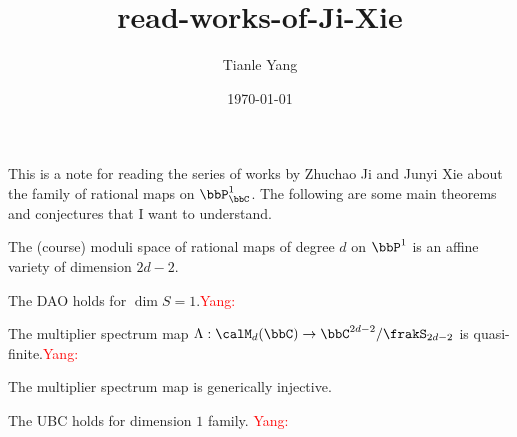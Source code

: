 \documentclass[sectionlevel=chapter]{noteformyself}
\title{read-works-of-Ji-Xie}
\author{Tianle Yang}
\date{\today}
\newcommand{\Yang}[1]{\textcolor{red}{Yang: #1}}
\begin{document}

\tableofcontents

\vspace{2em}
This is a note for reading the series of works by Zhuchao Ji and Junyi Xie about the family of rational maps on $\bbP^1_\bbC$.
The following are some main theorems and conjectures that I want to understand.

\begin{mainthm}
	The (course) moduli space of rational maps of degree $d$ on $\bbP^1$ is an affine variety of dimension $2d-2$.
\end{mainthm}


\begin{mainthm}
	The DAO holds for $\dim S = 1$.\Yang{}
\end{mainthm}

\begin{mainthm}
	The multiplier spectrum map $\Lambda: \calM_d(\bbC) \to \bbC^{2d-2}/\frakS_{2d-2}$ is quasi-finite.\Yang{}
\end{mainthm}

\begin{mainthm}
	The multiplier spectrum map is generically injective.
\end{mainthm}

\begin{mainthm}
	The UBC holds for dimension $1$ family. \Yang{}
\end{mainthm}



% 







\end{document}
